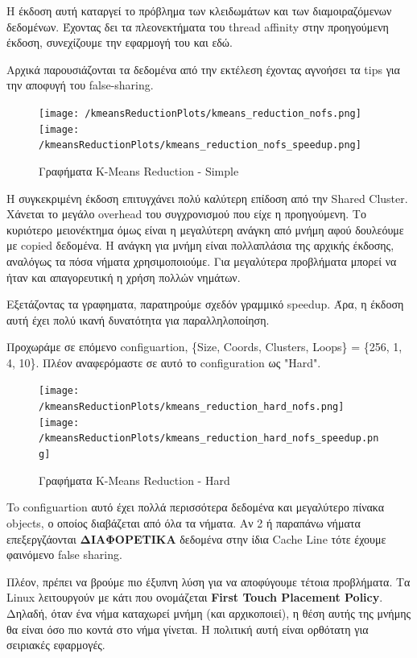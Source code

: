 \documentclass[letterpaper,12pt]{article}
\begin{document}
Η έκδοση αυτή καταργεί το πρόβλημα των κλειδωμάτων και των διαμοιραζόμενων δεδομένων. Έχοντας δει τα πλεονεκτήματα
του thread affinity στην προηγούμενη έκδοση, συνεχίζουμε την εφαρμογή του και εδώ.

Αρχικά παρουσιάζονται τα δεδομένα από την εκτέλεση έχοντας αγνοήσει τα tips για την αποφυγή του false-sharing.

\begin{figure}[H]
    \centering
    \texttt{[image: /kmeansReductionPlots/kmeans\_reduction\_nofs.png]}
    \texttt{[image: /kmeansReductionPlots/kmeans\_reduction\_nofs\_speedup.png]}
    \caption{Γραφήματα K-Means Reduction - Simple}
    \label{fig:Γραφήματα K-Means Reduction - Simple}
\end{figure}

Η συγκεκριμένη έκδοση επιτυγχάνει πολύ καλύτερη επίδοση από την Shared Cluster. Χάνεται το μεγάλο overhead του συγχρονισμού
που είχε η προηγούμενη. Το κυριότερο μειονέκτημα όμως είναι η μεγαλύτερη ανάγκη από μνήμη αφού δουλεόυμε με
copied δεδομένα. Η ανάγκη για μνήμη είναι πολλαπλάσια της αρχικής έκδοσης, αναλόγως τα πόσα νήματα χρησιμοποιούμε. Για
μεγαλύτερα προβλήματα μπορεί να ήταν και απαγορευτική η χρήση πολλών νημάτων. 

Εξετάζοντας τα γραφηματα, παρατηρούμε σχεδόν γραμμικό speedup. Άρα, η έκδοση αυτή έχει πολύ ικανή δυνατότητα για παραλληλοποίηση.

Προχωράμε σε επόμενο configuartion, \{Size, Coords, Clusters, Loops\} = \{256, 1, 4, 10\}. Πλέον αναφερόμαστε σε αυτό το 
configuration ως "Hard".
\vspace{4pt}

\begin{figure}[H]
    \centering
    \texttt{[image: /kmeansReductionPlots/kmeans\_reduction\_hard\_nofs.png]}
    \texttt{[image: /kmeansReductionPlots/kmeans\_reduction\_hard\_nofs\_speedup.png]}
    \caption{Γραφήματα K-Means Reduction - Hard}
    \label{fig:Γραφήματα K-Means Reduction - Hard}
\end{figure}

To configuartion αυτό έχει πολλά περισσότερα δεδομένα και μεγαλύτερο πίνακα objects, ο οποίος διαβάζεται από όλα τα νήματα.
Αν 2 ή παραπάνω νήματα επεξεργζάονται \textbf{ΔΙΑΦΟΡΕΤΙΚΑ} δεδομένα στην ίδια Cache Line τότε έχουμε φαινόμενο false sharing.

Πλέον, πρέπει να βρούμε πιο έξυπνη λύση για να αποφύγουμε τέτοια προβλήματα. Τα Linux λειτουργούν με κάτι που ονομάζεται
\textbf{First Touch Placement Policy}. Δηλαδή, όταν ένα νήμα καταχωρεί μνήμη (και αρχικοποιεί), η θέση αυτής της μνήμης θα είναι όσο πιο κοντά στο νήμα γίνεται.
Η πολιτική αυτή είναι ορθότατη για σειριακές εφαρμογές.
\end{document}
